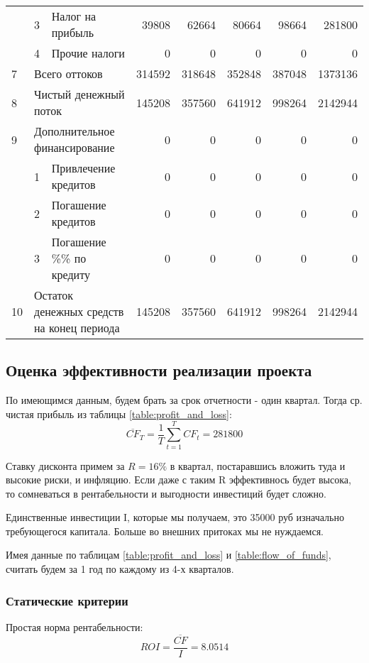 \begin{table}[!h]
{\begin{tabular}{l|l|l|r|r|r|r|r|}
				& 3 & Налог на прибыль  & 39808 & 62664 & 80664 & 98664 & 281800 \\ \cline{2-8} 
				& 4 & Прочие налоги & 0 & 0 & 0 & 0 & 0 \\ \hline
				\multicolumn{1}{|l|}{7} & \multicolumn{2}{l|}{Всего оттоков} & 314592 & 318648 & 352848 & 387048 & 1373136 \\ \hline
				\multicolumn{1}{|l|}{8} & \multicolumn{2}{l|}{Чистый денежный поток} & 145208 & 357560 & 641912 & 998264 & 2142944 \\ \hline
				\multicolumn{1}{|l|}{9} & \multicolumn{2}{l|}{Дополнительное финансирование} & 0 & 0 & 0 & 0 & 0 \\ \hline
				& 1 & Привлечение кредитов & 0 & 0 & 0 & 0 & 0 \\ \cline{2-8} 
				& 2 & Погашение кредитов & 0 & 0 & 0 & 0 & 0 \\ \cline{2-8} 
				& 3 & Погашение \%\% по кредиту & 0 & 0 & 0 & 0 & 0 \\ \hline
				\multicolumn{1}{|l|}{10} & \multicolumn{2}{l|}{Остаток денежных средств на конец периода} & 145208 & 357560 & 641912 & 998264 & 2142944 \\ \hline
			\end{tabular}
		}
	\end{table}
	
\subsection{Оценка эффективности реализации проекта} \label{subseq:performance}
	По имеющимся данным, будем брать за срок отчетности - один квартал. Тогда ср. чистая прибыль из таблицы  \ref{table:profit_and_loss}:
	\begin{equation}
	\overline{CF}_T = \dfrac{1}{T} \sum_{t = 1}^{T} CF_t = 281800
	\end{equation}
	
	Ставку дисконта примем за $R = 16\%$ в квартал, постаравшись вложить туда и высокие риски, и инфляцию. Если даже с таким R эффективнось будет высока, то сомневаться в рентабельности и выгодности инвестиций будет сложно.
	
	Единственные инвестиции I, которые мы получаем, это 35000 руб изначально требующегося капитала. Больше во внешних притоках мы не нуждаемся.
	
	Имея данные по таблицам \ref{table:profit_and_loss} и \ref{table:flow_of_funds}, считать будем за 1 год по каждому из 4-х кварталов.
	\subsubsection{Статические критерии}
	Простая норма рентабельности:
	\begin{equation}
	ROI = \dfrac{\overline{CF}}{I} = 8.0514
	\end{equation}
	
